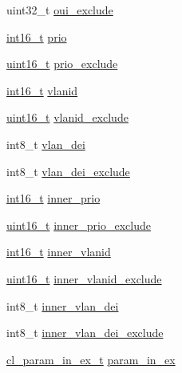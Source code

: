 \begin{DoxyCompactItemize}
\item 
uint32\-\_\-t \hyperlink{structcl__eth__match__t_adf4f05c03331311fd8b093be5b42eb6a}{oui\-\_\-exclude}
\item 
\hyperlink{commondefs_8h_a66634143db08bebe9b46ab4cb1fc6fd3}{int16\-\_\-t} \hyperlink{structcl__eth__match__t_a96a22755831c1d3251676ee7063e1c07}{prio}
\item 
\hyperlink{commondefs_8h_adf4d876453337156dde61095e1f20223}{uint16\-\_\-t} \hyperlink{structcl__eth__match__t_a239951c73fc57983cfbedbb886ba5dcc}{prio\-\_\-exclude}
\item 
\hyperlink{commondefs_8h_a66634143db08bebe9b46ab4cb1fc6fd3}{int16\-\_\-t} \hyperlink{structcl__eth__match__t_ae82737ae0d02ba92f5196a9d1a2b4e60}{vlanid}
\item 
\hyperlink{commondefs_8h_adf4d876453337156dde61095e1f20223}{uint16\-\_\-t} \hyperlink{structcl__eth__match__t_a72b9fe10cf00c934df759909399a399e}{vlanid\-\_\-exclude}
\item 
int8\-\_\-t \hyperlink{structcl__eth__match__t_aa59030fe883d3341c9d323cb53b3cb59}{vlan\-\_\-dei}
\item 
int8\-\_\-t \hyperlink{structcl__eth__match__t_ad4acd32623bc522bf2810a3f0198de04}{vlan\-\_\-dei\-\_\-exclude}
\item 
\hyperlink{commondefs_8h_a66634143db08bebe9b46ab4cb1fc6fd3}{int16\-\_\-t} \hyperlink{structcl__eth__match__t_af8ba880b8b5c93e090977755b2bb39de}{inner\-\_\-prio}
\item 
\hyperlink{commondefs_8h_adf4d876453337156dde61095e1f20223}{uint16\-\_\-t} \hyperlink{structcl__eth__match__t_ae8b56ca5dc1129b254498de569086f00}{inner\-\_\-prio\-\_\-exclude}
\item 
\hyperlink{commondefs_8h_a66634143db08bebe9b46ab4cb1fc6fd3}{int16\-\_\-t} \hyperlink{structcl__eth__match__t_a4cde4e74ac7e5b305a893159f6de939c}{inner\-\_\-vlanid}
\item 
\hyperlink{commondefs_8h_adf4d876453337156dde61095e1f20223}{uint16\-\_\-t} \hyperlink{structcl__eth__match__t_a43a9949e1abef1fa0669c88782fdcd9d}{inner\-\_\-vlanid\-\_\-exclude}
\item 
int8\-\_\-t \hyperlink{structcl__eth__match__t_a2dc088ea60a83a9842881c6f7700eb76}{inner\-\_\-vlan\-\_\-dei}
\item 
int8\-\_\-t \hyperlink{structcl__eth__match__t_ae6eb57d9d1bf6ac87e020af2ba603be0}{inner\-\_\-vlan\-\_\-dei\-\_\-exclude}
\item 
\hyperlink{structcl__param__in__ex__t}{cl\-\_\-param\-\_\-in\-\_\-ex\-\_\-t} \hyperlink{structcl__eth__match__t_a288c8e7ff8257e915cca4b3de17b4c9d}{param\-\_\-in\-\_\-ex}
\end{DoxyCompactItemize}


